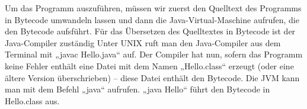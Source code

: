 Um das Programm auszuführen, müssen wir zuerst den Quelltext des Programms in Bytecode umwandeln lassen und dann die Java-Virtual-Maschine aufrufen, die den Bytecode aufsführt. 
Für das Übersetzen des Quelltextes in Bytecode ist der Java-Compiler zuständig
Unter UNIX ruft man den Java-Compiler aus dem Terminal mit „javac Hello.java“ auf. Der Compiler hat nun, sofern das Programm keine Fehler enthält eine Datei mit dem Namen „Hello.class“ erzeugt (oder eine ältere Version überschrieben) – diese Datei enthält den Bytecode.
Die JVM kann man mit dem Befehl „java“ aufrufen. „java Hello“ führt den Bytecode in Hello.class aus.
